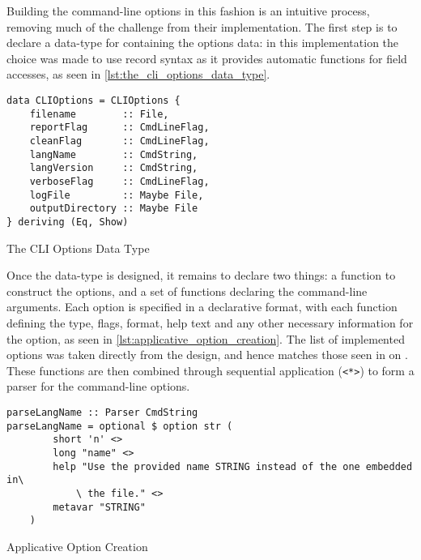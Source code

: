 Building the command-line options in this fashion is an intuitive process, removing much of the challenge from their implementation. 
The first step is to declare a data-type for containing the options data: in this implementation the choice was made to use record syntax as it provides automatic functions for field accesses, as seen in \autoref{lst:the_cli_options_data_type}.

\begin{listing}[!htb]
\begin{verbatim}
data CLIOptions = CLIOptions {
    filename        :: File,
    reportFlag      :: CmdLineFlag,
    cleanFlag       :: CmdLineFlag,
    langName        :: CmdString,
    langVersion     :: CmdString,
    verboseFlag     :: CmdLineFlag,
    logFile         :: Maybe File,
    outputDirectory :: Maybe File
} deriving (Eq, Show)
\end{verbatim}
\caption{The CLI Options Data Type}
\label{lst:the_cli_options_data_type}
\end{listing}

Once the data-type is designed, it remains to declare two things: a function to construct the options, and a set of functions declaring the command-line arguments.
Each option is specified in a declarative format, with each function defining the type, flags, format, help text and any other necessary information for the option, as seen in \autoref{lst:applicative_option_creation}.
The list of implemented options was taken directly from the design, and hence matches those seen in  on .
These functions are then combined through sequential application (\texttt{<*>}) to form a parser for the command-line options.

\begin{listing}[!htb]
\begin{verbatim}
parseLangName :: Parser CmdString
parseLangName = optional $ option str (
        short 'n' <>
        long "name" <>
        help "Use the provided name STRING instead of the one embedded in\
            \ the file." <>
        metavar "STRING"
    )
\end{verbatim}
\caption{Applicative Option Creation}
\label{lst:applicative_option_creation}
\end{listing}


